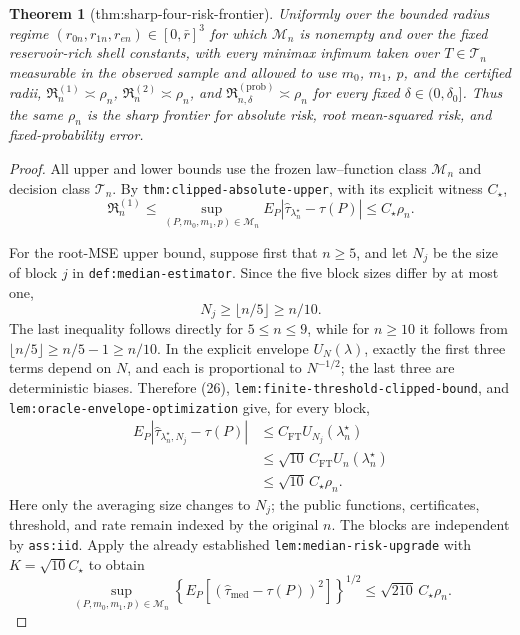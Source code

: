 \documentclass{article}
\newtheorem{theorem}{Theorem}
\begin{document}
\begin{theorem}[thm:sharp-four-risk-frontier]\label{thm:sharp-four-risk-frontier}
Uniformly over the bounded radius regime \( (r_{0n},r_{1n},r_{en})\in[0,\bar r]^3 \) for which \(\mathcal M_n\) is nonempty and over the fixed reservoir-rich shell constants, with every minimax infimum taken over \(T\in\mathcal T_n\) measurable in the observed sample and allowed to use \(m_0\), \(m_1\), \(p\), and the certified radii, \(\mathfrak R_n^{(1)}\asymp\rho_n\), \(\mathfrak R_n^{(2)}\asymp\rho_n\), and \(\mathfrak R_{n,\delta}^{(\mathrm{prob})}\asymp\rho_n\) for every fixed \(\delta\in(0,\delta_0]\). Thus the same \(\rho_n\) is the sharp frontier for absolute risk, root mean-squared risk, and fixed-probability error.
\end{theorem}
\begin{proof}
All upper and lower bounds use the frozen law--function class
\(\mathcal M_n\) and decision class \(\mathcal T_n\).  By
\texttt{thm:clipped-absolute-upper}, with its explicit witness
\(C_\star\),
\[
\mathfrak R_n^{(1)}
\leq\sup_{(P,m_0,m_1,p)\in\mathcal M_n}
E_P|\widehat\tau_{\lambda_n^\star}-\tau(P)|
\leq C_\star\rho_n.                                               \tag{25}
\]

For the root-MSE upper bound, suppose first that \(n\geq5\), and let \(N_j\)
be the size of block \(j\) in \texttt{def:median-estimator}.  Since the five
block sizes differ by at most one,
\[
N_j\geq\lfloor n/5\rfloor\geq n/10.                               \tag{26}
\]
The last inequality follows directly for \(5\leq n\leq9\), while for
\(n\geq10\) it follows from
\(\lfloor n/5\rfloor\geq n/5-1\geq n/10\).  In the explicit envelope
\(U_N(\lambda)\), exactly the first three terms depend on \(N\), and each is
proportional to \(N^{-1/2}\); the last three are deterministic biases.
Therefore (26), \texttt{lem:finite-threshold-clipped-bound}, and \texttt{lem:oracle-envelope-optimization} give, for every block,
\[
\begin{split}
E_P|\widehat\tau_{\lambda_n^\star,N_j}-\tau(P)|
&\leq C_{\mathrm{FT}}U_{N_j}(\lambda_n^\star)\\
&\leq\sqrt{10}\,C_{\mathrm{FT}}U_n(\lambda_n^\star)\\
&\leq\sqrt{10}\,C_\star\rho_n.
\end{split} \tag{27}
\]
Here only the averaging size changes to \(N_j\); the public functions,
certificates, threshold, and rate remain indexed by the original \(n\).
The blocks are independent by \texttt{ass:iid}.  Apply the already established
\texttt{lem:median-risk-upgrade} with
\(K=\sqrt{10}C_\star\) to obtain
\[
\sup_{(P,m_0,m_1,p)\in\mathcal M_n}
\left\{E_P[(\widehat\tau_{\mathrm{med}}-\tau(P))^2]\right\}^{1/2}
\leq\sqrt{210}\,C_\star\rho_n.                                   \tag{28}
\]


\end{proof}
\end{document}
